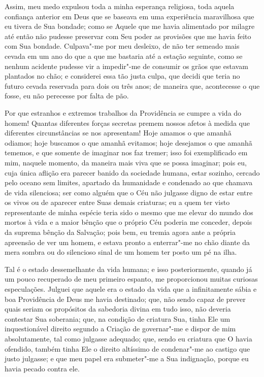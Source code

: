 Assim, meu medo expulsou toda a minha esperança religiosa, toda aquela
confiança anterior em Deus que se baseava em uma experiência maravilhosa
que eu tivera de Sua bondade; como se Aquele que me havia alimentado por
milagre até então não pudesse preservar com Seu poder as provisões que
me havia feito com Sua bondade. Culpava"-me por meu desleixo, de não ter
semeado mais cevada em um ano do que a que me bastaria até a estação
seguinte, como se nenhum acidente pudesse vir a impedir"-me de consumir
os grãos que estavam plantados no chão; e considerei essa tão justa
culpa, que decidi que teria no futuro cevada reservada para dois ou três
anos; de maneira que, acontecesse o que fosse, eu não perecesse por
falta de pão.

Por que estranhos e extremos trabalhos da Providência se cumpre a vida
do homem! Quantas diferentes forças secretas premem nossos afetos à
medida que diferentes circunstâncias se nos apresentam! Hoje amamos o
que amanhã odiamos; hoje buscamos o que amanhã evitamos; hoje desejamos
o que amanhã tememos, e que somente de imaginar nos faz tremer; isso foi
exemplificado em mim, naquele momento, da maneira mais viva que se possa
imaginar; pois eu, cuja única aflição era parecer banido da sociedade
humana, estar sozinho, cercado pelo oceano sem limites, apartado da
humanidade e condenado ao que chamava de vida silenciosa; ser como
alguém que o Céu não julgasse digno de estar entre os vivos ou de
aparecer entre Suas demais criaturas; eu a quem ter visto representante
de minha espécie teria sido o mesmo que me elevar do mundo dos mortos à
vida e a maior bênção que o próprio Céu poderia me conceder, depois da
suprema bênção da Salvação; pois bem, eu tremia agora ante a própria
apreensão de ver um homem, e estava pronto a enterrar"-me no chão diante
da mera sombra ou do silencioso sinal de um homem ter posto um pé na
ilha.

Tal é o estado dessemelhante da vida humana; e isso posteriormente,
quando já um pouco recuperado de meu primeiro espanto, me proporcionou
muitas curiosas especulações. Julguei que aquele era o estado da vida
que a infinitamente sábia e boa Providência de Deus me havia destinado;
que, não sendo capaz de prever quais seriam os propósitos da sabedoria
divina em tudo isso, não deveria contestar Sua soberania; que, na
condição de criatura Sua, tinha Ele um inquestionável direito segundo a
Criação de governar"-me e dispor de mim absolutamente, tal como julgasse
adequado; que, sendo eu criatura que O havia ofendido, também tinha Ele
o direito altíssimo de condenar"-me ao castigo que justo julgasse; e que
meu papel era submeter"-me a Sua indignação, porque eu havia pecado
contra ele.

